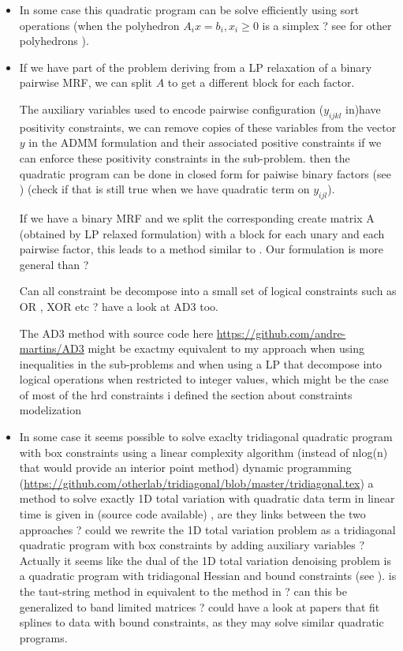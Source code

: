 \documentclass[11pt]{article}
\begin{document}
\begin{itemize}
\item
 In some case this quadratic program can be solve efficiently using sort operations (when the polyhedron $A_ix=b_i, x_i\geq 0$ is a simplex ? see  \cite{Smith2011} for other polyhedrons ). 
 
 \item  If we have part of the problem deriving from a LP relaxation of a binary pairwise MRF, we can split $A$ to get a different block for each factor.
 
 The auxiliary variables used to encode pairwise configuration ($y_{ijkl}$ in\label{eqn:local_marginal_polytope})have positivity constraints,  we can remove copies of these variables from the vector $y$ in the ADMM formulation and their associated  positive constraints if we can enforce these positivity constraints in the sub-problem.  
 then the quadratic program can  be done in closed form for paiwise binary factors (see \cite{Smith2011}) (check if that is still true when we have quadratic term on $y_{ijl}$).
  
If  we have a binary MRF and we split the corresponding create matrix A (obtained by  LP relaxed formulation) with a block for each unary and each pairwise factor, this leads to a method similar to \cite{Smith2011}.  Our formulation is more  general than \cite{Smith2011}?

Can all constraint be decompose into a small set of logical constraints such as OR , XOR etc ?
have a look at AD3 too.

The AD3 method with source code here
\url{https://github.com/andre-martins/AD3} might be exactmy equivalent to my approach when using inequalities in the sub-problems and
when using a LP that decompose into logical operations when restricted to integer values, which might be the case of most of the hrd constraints i 
defined the section about constraints modelization
 
 \item
In some case it seems possible to solve exaclty  tridiagonal quadratic program with box constraints using a linear complexity algorithm (instead of nlog(n) that would provide an interior point method) dynamic programming \cite{Irving2015} (\url{https://github.com/otherlab/tridiagonal/blob/master/tridiagonal.tex}) 
a method to solve exactly 1D total variation with quadratic data term in linear time  is given in \cite{Condat2013} (source code available)
, are they links between the two approaches ? could we rewrite the 1D total variation problem as a tridiagonal quadratic program with box constraints by adding auxiliary variables ? 
Actually  it seems like the dual of the 1D total variation denoising problem is a quadratic program with tridiagonal Hessian and bound constraints (see \cite{Tom2013}).
is the taut-string method in \cite{Tom2013} equivalent to the method in \cite{Irving2015} ?
can this be generalized to band limited matrices ? 
could have a look at papers that fit splines to data  with bound constraints, as they may solve similar quadratic programs.



\end{itemize}
\end{document}
